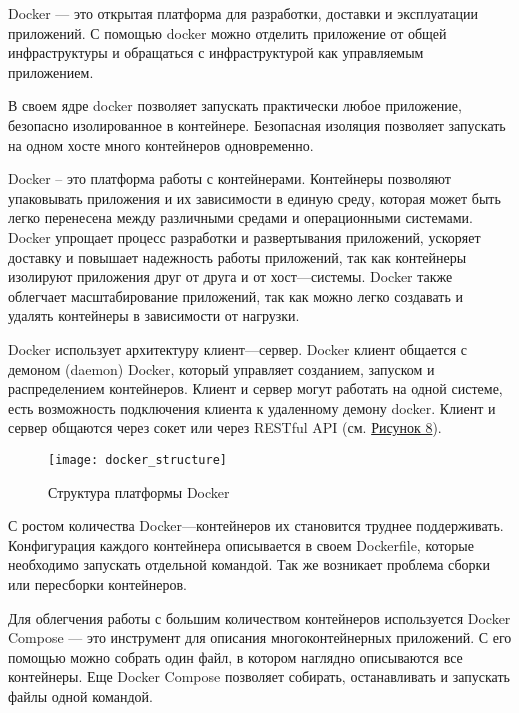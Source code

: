     Docker — это открытая платформа для разработки, доставки и эксплуатации приложений. С помощью docker можно отделить приложение от общей инфраструктуры и обращаться с инфраструктурой как управляемым приложением. 
    
    В своем ядре docker позволяет запускать практически любое приложение, безопасно изолированное в контейнере. Безопасная изоляция позволяет запускать на одном хосте много контейнеров одновременно. 
    
    Docker – это платформа работы с контейнерами. Контейнеры позволяют упаковывать приложения и их зависимости в единую среду, которая может быть легко перенесена между различными средами и операционными системами. Docker упрощает процесс разработки и развертывания приложений, ускоряет доставку и повышает надежность работы приложений, так как контейнеры изолируют приложения друг от друга и от хост—системы. Docker также облегчает масштабирование приложений, так как можно легко создавать и удалять контейнеры в зависимости от нагрузки.
    
    Docker использует архитектуру клиент—сервер. Docker клиент общается с демоном (daemon) Docker, который управляет созданием, запуском и распределением контейнеров. Клиент и сервер могут работать на одной системе, есть возможность подключения клиента к удаленному демону docker. Клиент и сервер общаются через сокет или через RESTful API (см. \hyperlink{fig:docker_structure}{Рисунок 8}).

    \begin{figure}[ht]
        \centering
        \texttt{[image: docker\_structure]}
        \caption{Структура платформы Docker}
        \label{fig:docker_structure}
    \end{figure}

    С ростом количества Docker—контейнеров их становится труднее поддерживать. Конфигурация каждого контейнера описывается в своем Dockerfile, которые необходимо запускать отдельной командой. Так же возникает проблема сборки или пересборки контейнеров.

    Для облегчения работы с большим количеством контейнеров используется Docker Compose — это инструмент для описания многоконтейнерных приложений. С его помощью можно собрать один файл, в котором наглядно описываются все контейнеры. Еще Docker Compose позволяет собирать, останавливать и запускать файлы одной командой.
    
